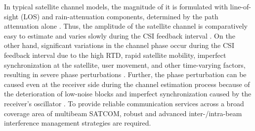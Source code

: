 \documentclass[draftclsnofoot, onecolumn, comsoc, 12pt]{IEEEtran}
\begin{document}
{ In typical satellite channel models, the magnitude of it is formulated with line-of-sight (LOS) and rain-attenuation components, determined by the path attenuation alone \cite{lin2021secrecy, lin2022refracting, lin2022slnr, gharanjik2015robust, zhang2019robust}.} Thus, the amplitude of the satellite channel is comparatively easy to estimate and varies slowly during the CSI feedback interval \cite{zhang2019robust}. 
{On the other hand, significant variations in the channel phase occur during the CSI feedback interval due to the high RTD, rapid satellite mobility, imperfect synchronization at the satellite, user movement, and other time-varying factors, resulting in severe phase perturbations \cite{vazquez2016precoding, gharanjik2015robust, zhang2019robust, wang2021resource}.}
Further, the phase perturbation can be caused even at the receiver side during the channel estimation process because of the deterioration of low-noise blocks and imperfect synchronization caused by the receiver's oscillator \cite{wang2021resource}. To provide reliable communication services across a broad coverage area of multibeam SATCOM, robust and advanced inter-/intra-beam interference management strategies are required.
\end{document}
